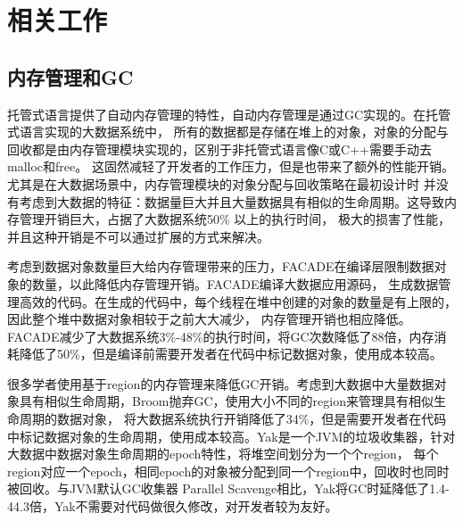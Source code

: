 
\chapter{相关工作}

\section{内存管理和GC}
托管式语言提供了自动内存管理的特性，自动内存管理是通过GC实现的。在托管式语言实现的大数据系统中，
所有的数据都是存储在堆上的对象，对象的分配与回收都是由内存管理模块实现的，区别于非托管式语言像C或C++需要手动去malloc和free。
这固然减轻了开发者的工作压力，但是也带来了额外的性能开销。尤其是在大数据场景中，内存管理模块的对象分配与回收策略在最初设计时
并没有考虑到大数据的特征：数据量巨大并且大量数据具有相似的生命周期。这导致内存管理开销巨大，占据了大数据系统50\% 以上的执行时间，
极大的损害了性能，并且这种开销是不可以通过扩展的方式来解决。

考虑到数据对象数量巨大给内存管理带来的压力，FACADE\cite{nguyen2015facade}在编译层限制数据对象的数量，以此降低内存管理开销。FACADE编译大数据应用源码，
生成数据管理高效的代码。在生成的代码中，每个线程在堆中创建的对象的数量是有上限的，因此整个堆中数据对象相较于之前大大减少，
内存管理开销也相应降低。FACADE减少了大数据系统3\%-48\%的执行时间，将GC次数降低了88倍，内存消耗降低了50\%，但是编译前需要开发者在代码中标记数据对象，使用成本较高。

很多学者使用基于region的内存管理来降低GC开销。考虑到大数据中大量数据对象具有相似生命周期，Broom\cite{gog2015broom}抛弃GC，使用大小不同的region来管理具有相似生命周期的数据对象，
将大数据系统执行开销降低了34\%，但是需要开发者在代码中标记数据对象的生命周期，使用成本较高。Yak\cite{nguyen2016yak}是一个JVM的垃圾收集器，针对大数据中数据对象生命周期的epoch特性，将堆空间划分为一个个region，
每个region对应一个epoch，相同epoch的对象被分配到同一个region中，回收时也同时被回收。与JVM默认GC收集器 Parallel Scavenge相比，Yak将GC时延降低了1.4-44.3倍，Yak不需要对代码做很久修改，对开发者较为友好。


